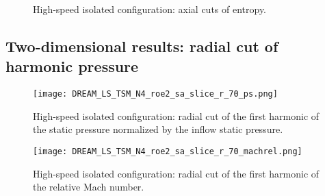 \begin{figure}[htp]
  \centering
  \caption{High-speed isolated configuration: axial cuts of entropy.}
   \label{fig:dream_hs_hb_axial_cut_entropy}
\end{figure}

\subsection{Two-dimensional results: radial cut of harmonic pressure}
\label{sub:dream_hs_hb_radial_cuts}

\begin{figure}[htp]
  \centering
  \texttt{[image: DREAM\_LS\_TSM\_N4\_roe2\_sa\_slice\_r\_70\_ps.png]}
  \caption{High-speed isolated configuration: radial cut of the first harmonic of the
  static pressure normalized by the inflow static pressure.}
  \label{fig:dream_hs_hb_radial_cuts}
\end{figure}

\begin{figure}[htp]
  \centering
  \texttt{[image: DREAM\_LS\_TSM\_N4\_roe2\_sa\_slice\_r\_70\_machrel.png]}
  \caption{High-speed isolated configuration: radial cut of the first harmonic of the
  relative Mach number.}
  \label{fig:dream_hs_hb_radial_cuts_machrel}
\end{figure}